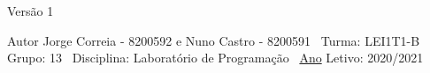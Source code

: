 \begin{DoxyVersion}{Versão}
1 
\end{DoxyVersion}
\begin{DoxyAuthor}{Autor}
Jorge Correia -\/ 8200592 e Nuno Castro -\/ 8200591~\newline
Turma\+: L\+E\+I1\+T1-\/B~\newline
Grupo\+: 13~\newline
Disciplina\+: Laboratório de Programação~\newline
\mbox{\hyperlink{struct_ano}{Ano}} Letivo\+: 2020/2021 
\end{DoxyAuthor}
